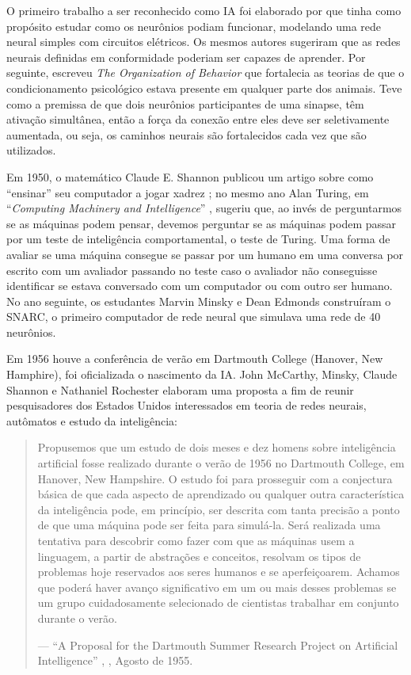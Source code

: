 \documentclass[
  openany]{book}
\begin{document}
O primeiro trabalho a ser reconhecido como IA foi elaborado por \citet{mcculloch1943logical} que tinha como propósito estudar como os neurônios podiam funcionar, modelando uma rede neural simples com circuitos elétricos. Os mesmos autores sugeriram que as redes neurais definidas em conformidade poderiam ser capazes de aprender. Por seguinte, \citet{hebb1949organization} escreveu \emph{The Organization of Behavior} que fortalecia as teorias de que o condicionamento psicológico estava presente em qualquer parte dos animais. Teve como a premissa de que dois neurônios participantes de uma sinapse, têm ativação simultânea, então a força da conexão entre eles deve ser seletivamente aumentada, ou seja, os caminhos neurais são fortalecidos cada vez que são utilizados.

Em 1950, o matemático Claude E. Shannon publicou um artigo sobre como ``ensinar'' seu computador a jogar xadrez \citep{shannon1950xxii}; no mesmo ano Alan Turing, em ``\emph{Computing Machinery and Intelligence}'' \citep{turing1950computing},
sugeriu que, ao invés de perguntarmos se as máquinas podem pensar, devemos perguntar se as máquinas podem passar por um teste de inteligência comportamental, o teste de Turing. Uma forma de avaliar se uma máquina consegue se passar por um humano em uma conversa por escrito com um avaliador passando no teste caso o avaliador não conseguisse identificar se estava conversado com um computador ou com outro ser humano. No ano seguinte, os estudantes Marvin Minsky e Dean Edmonds construíram o SNARC, o primeiro computador de rede neural que simulava uma rede de 40 neurônios.

Em 1956 houve a conferência de verão em Dartmouth College (Hanover, New Hamphire), foi oficializada o nascimento da IA. John McCarthy, Minsky, Claude Shannon e Nathaniel Rochester elaboram uma proposta a fim de reunir pesquisadores dos Estados Unidos interessados em teoria de redes neurais, autômatos e estudo da inteligência:

\begin{quote}
Propusemos que um estudo de dois meses e dez homens sobre inteligência artificial fosse realizado durante o verão de 1956 no Dartmouth College, em Hanover, New Hampshire. O estudo foi para prosseguir com a conjectura básica de que cada aspecto de aprendizado ou qualquer outra característica da inteligência pode, em princípio, ser descrita com tanta precisão a ponto de
que uma máquina pode ser feita para simulá-la. Será realizada uma tentativa para descobrir como fazer com que as máquinas usem a linguagem, a partir de abstrações e conceitos, resolvam os tipos
de problemas hoje reservados aos seres humanos e se aperfeiçoarem. Achamos que poderá haver avanço significativo em um ou mais desses problemas se um grupo cuidadosamente selecionado de cientistas trabalhar em conjunto durante o verão.

--- ``A Proposal for the Dartmouth Summer Research Project on Artificial Intelligence'' , \citet{mccarthy2006proposal} , Agosto de 1955.
\end{quote}
\end{document}
